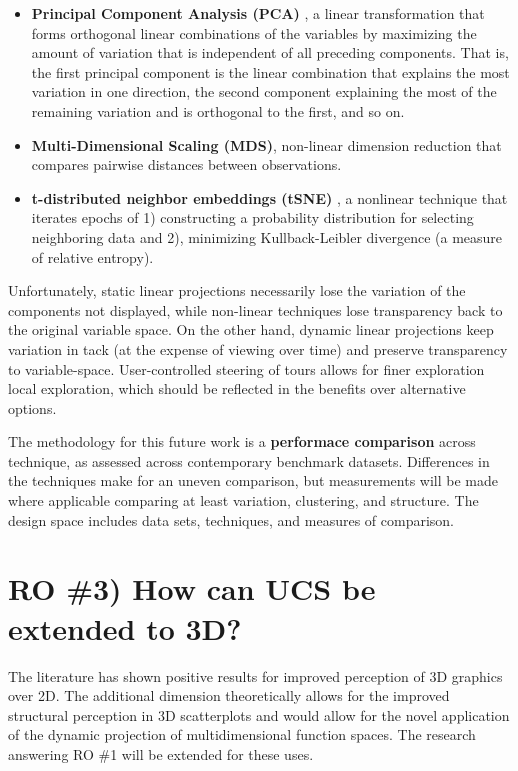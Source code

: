 \documentclass{monashthesis}
\begin{document}
\begin{itemize}
\tightlist
\item
  \textbf{Principal Component Analysis (PCA)}
  \autocite{pearson_liii._1901}, a linear transformation that forms
  orthogonal linear combinations of the variables by maximizing the
  amount of variation that is independent of all preceding components.
  That is, the first principal component is the linear combination that
  explains the most variation in one direction, the second component
  explaining the most of the remaining variation and is orthogonal to
  the first, and so on.
\item
  \textbf{Multi-Dimensional Scaling (MDS)}, non-linear dimension
  reduction that compares pairwise distances between observations.
\item
  \textbf{t-distributed neighbor embeddings (tSNE)}
  \autocite{maaten_visualizing_2008}, a nonlinear technique that
  iterates epochs of 1) constructing a probability distribution for
  selecting neighboring data and 2), minimizing Kullback-Leibler
  divergence (a measure of relative entropy).
\end{itemize}

Unfortunately, static linear projections necessarily lose the variation
of the components not displayed, while non-linear techniques lose
transparency back to the original variable space. On the other hand,
dynamic linear projections keep variation in tack (at the expense of
viewing over time) and preserve transparency to variable-space.
User-controlled steering of tours allows for finer exploration local
exploration, which should be reflected in the benefits over alternative
options.

The methodology for this future work is a \textbf{performace comparison}
across technique, as assessed across contemporary benchmark datasets.
Differences in the techniques make for an uneven comparison, but
measurements will be made where applicable comparing at least variation,
clustering, and structure. The design space includes data sets,
techniques, and measures of comparison.

\section{RO \#3) How can UCS be extended to
3D?}\label{ro-3-how-can-ucs-be-extended-to-3d}

The literature has shown positive results for improved perception of 3D
graphics over 2D. The additional dimension theoretically allows for the
improved structural perception in 3D scatterplots and would allow for
the novel application of the dynamic projection of multidimensional
function spaces. The research answering RO \#1 will be extended for
these uses.
\end{document}
